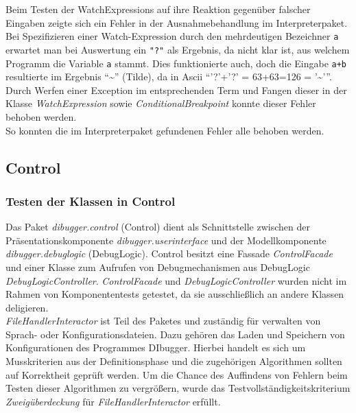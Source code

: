 \documentclass[parskip=full]{scrartcl}
\begin{document}
Beim Testen der WatchExpressions auf ihre Reaktion gegenüber falscher Eingaben zeigte sich ein Fehler in der Ausnahmebehandlung im Interpreterpaket. Bei Spezifizieren einer Watch-Expression durch den mehrdeutigen Bezeichner \texttt{a} erwartet man bei Auswertung ein \texttt{"?"} als Ergebnis, da nicht klar ist, aus welchem Programm die Variable \texttt{a} stammt. Dies funktionierte auch, doch die Eingabe \texttt{a+b} resultierte im Ergebnis \enquote{\~{}} (Tilde), da in Ascii \enquote{'?'+'?' = 63+63=126 = '\~{}'}.
Durch Werfen einer Exception im entsprechenden Term und Fangen dieser in der Klasse \textit{WatchExpression} sowie \textit{ConditionalBreakpoint} konnte dieser Fehler behoben werden.
\\
So konnten die im Interpreterpaket gefundenen Fehler alle behoben werden.
\subsection{Control}

\subsubsection{Testen der Klassen in Control}
Das Paket \textit{dibugger.control} (Control) dient als Schnittstelle zwischen der Präsentationskomponente \textit{dibugger.userinterface} und der Modellkomponente \textit{dibugger.debuglogic} (DebugLogic).
Control besitzt eine Fassade \textit{ControlFacade} und einer Klasse zum Aufrufen von Debugmechanismen aus DebugLogic \textit{DebugLogicController}.
\textit{ControlFacade} und \textit{DebugLogicController} wurden nicht im Rahmen von \glspl{Komponententest} getestet, da sie ausschließlich an andere Klassen deligieren.\\
\textit{FileHandlerInteractor} ist Teil des Paketes und zuständig für verwalten von Sprach- oder Konfigurationsdateien.
Dazu gehören das Laden und Speichern von Konfigurationen des Programmes DIbugger.
Hierbei handelt es sich um Musskriterien aus der Definitionsphase und die zugehörigen Algorithmen sollten auf Korrektheit geprüft werden.
Um die Chance des Auffindens von Fehlern beim Testen dieser Algorithmen zu vergrößern, wurde das Testvollständigkeitskriterium \textit{Zweigüberdeckung} für \textit{FileHandlerInteractor} erfüllt.
\end{document}
